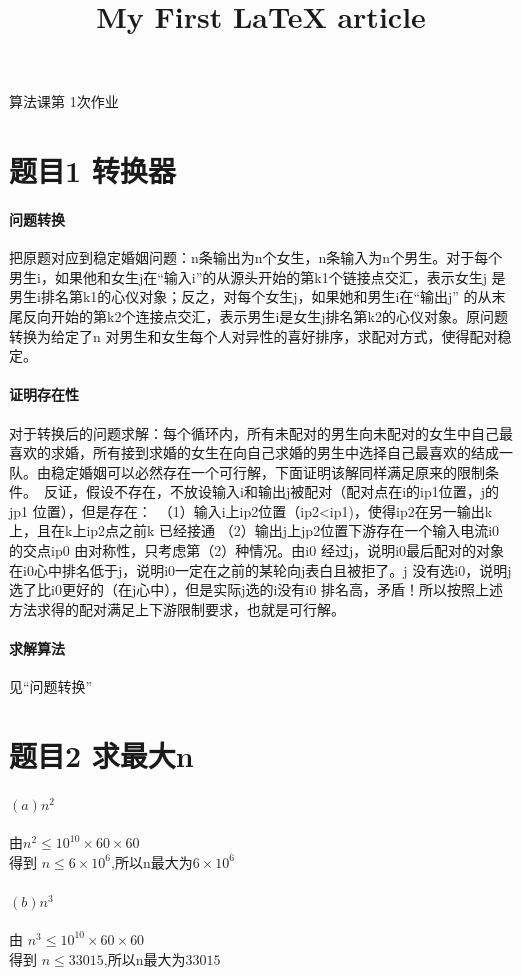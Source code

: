 \documentclass[a4paper,10pt]{article}
\title{My First \LaTeX{} article}
\begin{document}
\begin{center}
\LARGE 算法课第 1次作业
\end{center}
\section{题目1 转换器}
  \normalsize
  \paragraph{问题转换}
  把原题对应到稳定婚姻问题：n条输出为n个女生，n条输入为n个男生。对于每个男生i，如果他和女生j在“输入i”的从源头开始的第k1个链接点交汇，表示女生j 是男生i排名第k1的心仪对象；反之，对每个女生j，如果她和男生i在“输出j” 的从末尾反向开始的第k2个连接点交汇，表示男生i是女生j排名第k2的心仪对象。原问题转换为给定了n 对男生和女生每个人对异性的喜好排序，求配对方式，使得配对稳定。
  \paragraph{证明存在性}
  对于转换后的问题求解：每个循环内，所有未配对的男生向未配对的女生中自己最喜欢的求婚，所有接到求婚的女生在向自己求婚的男生中选择自己最喜欢的结成一队。由稳定婚姻可以必然存在一个可行解，下面证明该解同样满足原来的限制条件。\
  反证，假设不存在，不放设输入i和输出j被配对（配对点在i的ip1位置，j的jp1 位置），但是存在：\
  （1）输入i上ip2位置（ip2<ip1)，使得ip2在另一输出k上，且在k上ip2点之前k 已经接通
  （2）输出j上jp2位置下游存在一个输入电流i0的交点ip0
  由对称性，只考虑第（2）种情况。由i0 经过j，说明i0最后配对的对象在i0心中排名低于j，说明i0一定在之前的某轮向j表白且被拒了。j 没有选i0，说明j 选了比i0更好的（在j心中），但是实际j选的i没有i0 排名高，矛盾！所以按照上述方法求得的配对满足上下游限制要求，也就是可行解。
  \paragraph{求解算法}
  见“问题转换”\

\section{题目2 求最大n}
  \paragraph{$(a) n^2 $}
  由$n^2 \leqslant 10^{10} \times 60 \times 60$ \\ 得到 $n\leqslant6\times10^6$,所以n最大为$6\times10^6$
  \paragraph{$(b) n^3 $}
  由 $n^3\leqslant10^{10}\times60\times60$ \\ 得到 $n\leqslant33015 $,所以n最大为$33015$
\end{document}
